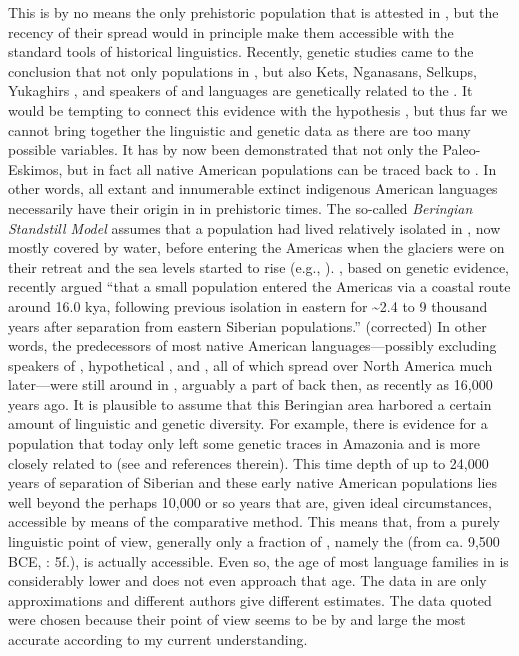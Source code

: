 \largerpage
\noindent This is by no means the only prehistoric population that is attested in , but the recency of their spread would in principle make them accessible with the standard tools of historical linguistics. Recently, genetic studies came to the conclusion that not only populations in , but also Kets, Nganasans, Selkups, Yukaghirs \citep{FlegontovChangmai2016}, and speakers of  and  languages \citep[175, 183]{Reich2018} are genetically related to the . It would be tempting to connect this evidence with the  hypothesis \citep{Vajda2010}, but thus far we cannot bring together the linguistic and genetic data as there are too many possible variables. It has by now been demonstrated that not only the Paleo-Eskimos, but in fact all native American populations can be traced back to . In other words, all extant and innumerable extinct indigenous American languages necessarily have their origin in  in prehistoric times. The so-called \textit{Beringian Standstill Model} assumes that a population had lived relatively isolated in , now mostly covered by water, before entering the Americas when the glaciers were on their retreat and the sea levels started to rise (e.g., \citealt{Moreno-MayarPotter2018}). \citet[1]{LlamasFehren-Schmitz2016}, based on genetic evidence, recently argued “that a small population entered the Americas via a coastal route around 16.0 kya, following previous isolation in eastern  for {\textasciitilde}2.4 to 9 thousand years after separation from eastern Siberian populations.” (corrected) In other words, the predecessors of most native American languages---possibly excluding speakers of , hypothetical , and , all of which spread over North America much later---were still around in , arguably a part of  back then, as recently as 16,000 years ago. It is plausible to assume that this Beringian area harbored a certain amount of linguistic and genetic diversity. For example, there is evidence for a population that today only left some genetic traces in Amazonia and is more closely related to  (see \citealt[176-181]{Reich2018} and references therein). This time depth of up to 24,000 years of separation of Siberian and these early native American populations lies well beyond the perhaps 10,000 or so years that are, given ideal circumstances, accessible by means of the comparative method. This means that, from a purely linguistic point of view, generally only a fraction of , namely the  (from ca. 9,500 BCE, \citealt{Bellwood2013}: 5f.), is actually accessible. Even so, the age of most language families in  is considerably lower and does not even approach that age. The data in  are only approximations and different authors give different estimates. The data quoted were chosen because their point of view seems to be by and large the most accurate according to my current understanding.
\newpage

